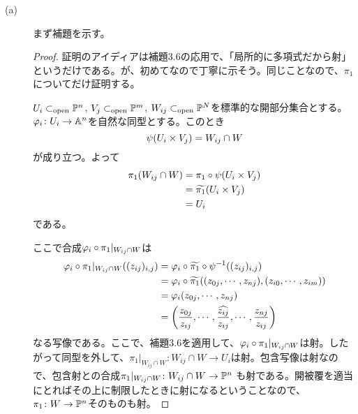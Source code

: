 \begin{description}
    \item[(a)] まず補題を示す。

\begin{proof}
  証明のアイディアは補題3.6の応用で、「局所的に多項式だから射」というだけである。が、初めてなので丁寧に示そう。同じことなので、$\pi_1$についてだけ証明する。

  $U_i \opsub \P^n$, $V_j\opsub \P^m$, $W_{ij} \opsub \P^N$を標準的な開部分集合とする。$\vp_i \colon U_i \to \A^n$を自然な同型とする。このとき
  \[
  \psi(U_i \tm V_j) = W_{ij} \cap W
  \]
  が成り立つ。よって
  \begin{align*}
    \pi_1(W_{ij} \cap W) &= \pi_1 \circ \psi(U_i \tm V_j) \\
    &= \wt{\pi_1} (U_i \tm V_j ) \\
    &= U_i
  \end{align*}
  である。

  ここで合成$\vp_i \circ \pi_1|_{W_{ij} \cap W}$は
  \begin{align*}
    \vp_i \circ \pi_1|_{W_{ij} \cap W} ((z_{ij})_{i,j}) &= \vp_i \circ \wt{\pi_1} \circ \psi^{-1} ((z_{ij})_{i,j}) \\
    &= \vp_i \circ \wt{\pi_1} ((z_{0j}, \cdots , z_{nj}), (z_{i0}, \cdots , z_{im})) \\
    &= \vp_i (z_{0j}, \cdots , z_{nj}) \\
    &= \left( \f{z_{0j}}{z_{ij}}, \cdots ,  \widehat{\f{z_{ij}}{z_{ij}} }, \cdots , \f{z_{nj}}{z_{ij}} \right)
  \end{align*}
  なる写像である。ここで、補題3.6を適用して、$\vp_i \circ \pi_1|_{W_{ij} \cap W}$は射。したがって同型を外して、$\pi_1|_{W_{ij} \cap W} \colon W_{ij} \cap W \to U_i $は射。包含写像は射なので、包含射との合成$\pi_1|_{W_{ij} \cap W} \colon W_{ij} \cap W \to \P^n$
  も射である。開被覆を適当にとればその上に制限したときに射になるということなので、$\pi_1 \colon W \to \P^n$そのものも射。
\end{proof}




\end{description}
